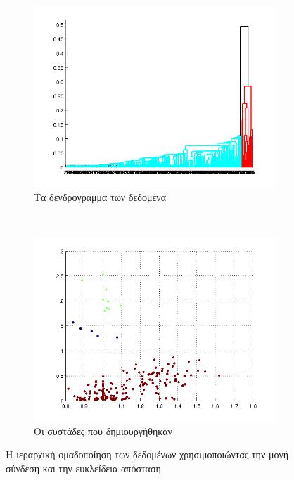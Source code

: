 \documentclass{assignment}
\begin{document}
\begin{figure}[htbp]
  \centering
  \begin{subfigure}[b]{0.5\textwidth}
     \includegraphics[width=\textwidth,height=0.25\textheight]{matlab/hierarchical_dendogram_single_euclidean.png}
  \caption{Τα δενδρογραμμα των δεδομένα}
  \end{subfigure}%
   ~ %
  \begin{subfigure}[b]{0.5\textwidth}
    \includegraphics[width=\textwidth,height=0.25\textheight]{matlab/identified_clusters_single_euclidean.png}
  \caption{Οι συστάδες που δημιουργήθηκαν}
  \end{subfigure}
  \caption{Η ιεραρχική ομαδοποίηση των δεδομένων χρησιμοποιώντας την μονή σύνδεση και την ευκλείδεια απόσταση}
\label{fig:clustering_single_euclidean}
\end{figure}
\end{document}
